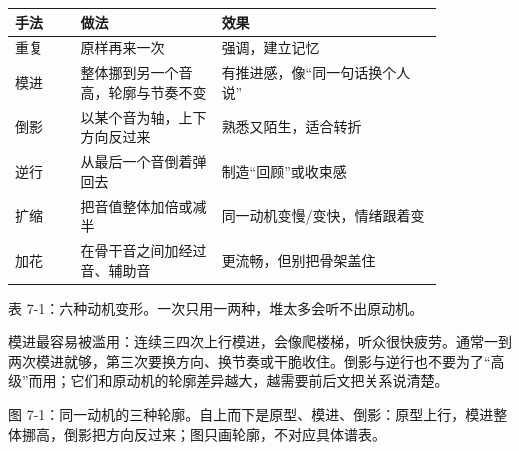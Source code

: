 \begin{center}
\small
\begin{tabular}{p{0.13\linewidth}p{0.28\linewidth}p{0.44\linewidth}}
\toprule
手法 & 做法 & 效果 \\
\midrule
重复 & 原样再来一次 & 强调，建立记忆 \\
模进 & 整体挪到另一个音高，轮廓与节奏不变 & 有推进感，像“同一句话换个人说” \\
倒影 & 以某个音为轴，上下方向反过来 & 熟悉又陌生，适合转折 \\
逆行 & 从最后一个音倒着弹回去 & 制造“回顾”或收束感 \\
扩缩 & 把音值整体加倍或减半 & 同一动机变慢/变快，情绪跟着变 \\
加花 & 在骨干音之间加经过音、辅助音 & 更流畅，但别把骨架盖住 \\
\bottomrule
\end{tabular}

表 7-1：六种动机变形。一次只用一两种，堆太多会听不出原动机。
\end{center}

模进最容易被滥用：连续三四次上行模进，会像爬楼梯，听众很快疲劳。通常一到两次模进就够，第三次要换方向、换节奏或干脆收住。倒影与逆行也不要为了“高级”而用；它们和原动机的轮廓差异越大，越需要前后文把关系说清楚。

\begin{center}
\begin{minipage}{0.86\linewidth}
\centering
{}

图 7-1：同一动机的三种轮廓。自上而下是原型、模进、倒影：原型上行，模进整体挪高，倒影把方向反过来；图只画轮廓，不对应具体谱表。
\end{minipage}
\end{center}

